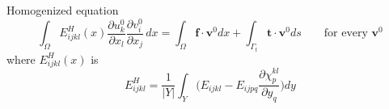 \documentclass[10pt]{article}
\begin{document}
Homogenized equation
\begin{equation}
\int_\Omega E^H_{ijkl}(x)\frac{\partial u_{k}^0}{\partial x_l}\frac{\partial v_{i}^0}{\partial x_j}\,dx = \int_\Omega\textbf{f}\cdot\textbf{v}^0 dx + \int_{\Gamma_t}\textbf{t}\cdot\textbf{v}^0 ds \qquad \text{for every } \textbf{v}^0
\end{equation}
where $E^H_{ijkl}(x)$ is
\begin{equation}
\label{eq:homogenized}
\boxed{E^H_{ijkl} = \frac{1}{|Y|}\int_Y \bigg (E_{ijkl}-E_{ijpq}\frac{\partial \chi^{kl}_p}{\partial y_q}\bigg ) dy}
\end{equation}
\end{document}

